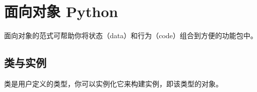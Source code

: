 \chapter{面向对象 Python\label{Ch04}}
面向对象的范式可帮助你将状态（data）和行为（code）组合到方便的功能包中。
\section{类与实例}
类是用户定义的类型，你可以实例化它来构建实例，即该类型的对象。